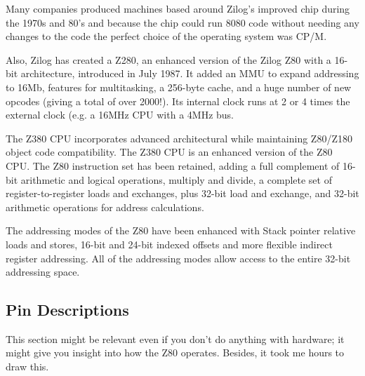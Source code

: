 Many companies produced machines based around Zilog's improved chip during the 1970s and 80's and because the chip could run 8080 code without needing any changes to the code the perfect choice of the operating system was CP/M. 

Also, Zilog has created a Z280, an enhanced version of the Zilog Z80 with a 16-bit architecture, introduced in July 1987. It added an MMU to expand addressing to 16Mb, features for multitasking, a 256-byte cache, and a huge number of new opcodes (giving a total of over 2000!). Its internal clock runs at 2 or 4 times the external clock (e.g. a 16MHz CPU with a 4MHz bus.

The Z380 CPU incorporates advanced architectural while maintaining Z80/Z180 object code compatibility. The Z380 CPU is an enhanced version of the Z80 CPU. The Z80 instruction set has been retained, adding a full complement of 16-bit arithmetic and logical operations, multiply and divide, a complete set of register-to-register loads and exchanges, plus 32-bit load and exchange, and 32-bit arithmetic operations for address calculations.

The addressing modes of the Z80 have been enhanced with Stack pointer relative loads and stores, 16-bit and 24-bit indexed offsets and more flexible indirect register addressing. All of the addressing modes allow access to the entire 32-bit addressing space.


\subsection{Pin Descriptions \cite{datasheet}}

This section might be relevant even if you don't do anything with hardware; it might give you insight into how the Z80 operates. Besides, it took me hours to draw this.

